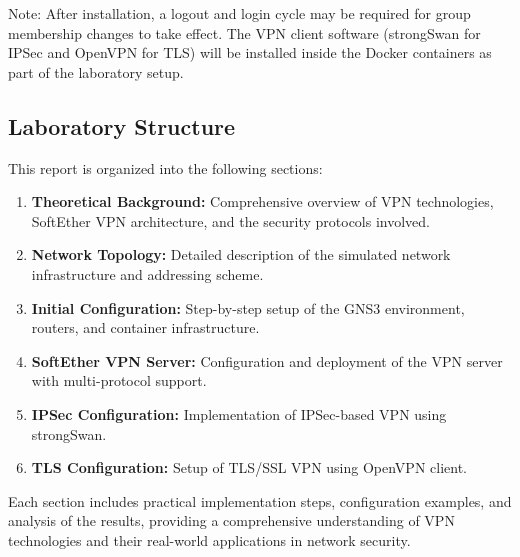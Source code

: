 Note: After installation, a logout and login cycle may be required for group membership changes to take effect. The VPN client software (strongSwan for IPSec and OpenVPN for TLS) will be installed inside the Docker containers as part of the laboratory setup.

\subsection{Laboratory Structure}

This report is organized into the following sections:

\begin{enumerate}
    \item \textbf{Theoretical Background:} Comprehensive overview of VPN technologies, SoftEther VPN architecture, and the security protocols involved.
    
    \item \textbf{Network Topology:} Detailed description of the simulated network infrastructure and addressing scheme.
    
    \item \textbf{Initial Configuration:} Step-by-step setup of the GNS3 environment, routers, and container infrastructure.
    
    \item \textbf{SoftEther VPN Server:} Configuration and deployment of the VPN server with multi-protocol support.
    
    \item \textbf{IPSec Configuration:} Implementation of IPSec-based VPN using strongSwan.
    
    \item \textbf{TLS Configuration:} Setup of TLS/SSL VPN using OpenVPN client.
        
\end{enumerate}

Each section includes practical implementation steps, configuration examples, and analysis of the results, providing a comprehensive understanding of VPN technologies and their real-world applications in network security.

